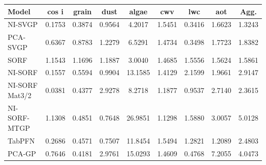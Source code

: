 \begin{tabular}{lcccccccc}
\toprule
Model & cos i & grain & dust & algae & cwv & lwc & aot & Agg. \\
\midrule
NI-SVGP & 0.1753 & 0.3874 & 0.9564 & 4.2017 & 1.5451 & 0.3416 & 1.6623 & 1.3243 \\
PCA-SVGP & 0.6367 & 0.8783 & 1.2279 & 6.5291 & 1.4734 & 0.3498 & 1.7723 & 1.8382 \\
SORF & 1.1543 & 1.1696 & 1.1887 & 3.0040 & 1.4685 & 1.5556 & 1.5624 & 1.5861 \\
NI-SORF & 0.1557 & 0.5594 & 0.9904 & 13.1585 & 1.4129 & 2.1599 & 1.9661 & 2.9147 \\
NI-SORF Mat3/2 & 0.0381 & 0.4377 & 2.9278 & 8.2718 & 1.1877 & 0.9537 & 2.7140 & 2.3615 \\
NI-SORF-MTGP & 1.1308 & 0.4851 & 0.7648 & 26.9851 & 1.1298 & 1.5880 & 3.0057 & 5.0128 \\
TabPFN & 0.2686 & 0.4571 & 0.7507 & 11.8454 & 1.5494 & 1.2821 & 1.2089 & 2.4803 \\
PCA-GP & 0.7646 & 0.4181 & 2.9761 & 15.0293 & 1.4609 & 0.4768 & 7.2055 & 4.0473 \\
\bottomrule
\end{tabular}